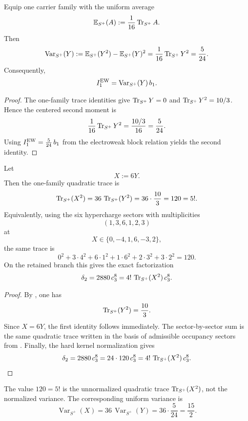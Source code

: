 \begin{corollary}
Equip one carrier family with the uniform average
\[
\mathbb E_{S^+}(A):=\frac{1}{16}\operatorname{Tr}_{S^+}A.
\]
Then
\[
\operatorname{Var}_{S^+}(Y)
:=
\mathbb E_{S^+}(Y^2)-\mathbb E_{S^+}(Y)^2
=
\frac{1}{16}\operatorname{Tr}_{S^+}Y^2
=
\frac{5}{24}.
\]
Consequently,
\[
I_1^{\mathrm{EW}}=\operatorname{Var}_{S^+}(Y)\,b_1.
\]
\end{corollary}

\begin{proof}
The one-family trace identities give $\operatorname{Tr}_{S^+}Y=0$ and $\operatorname{Tr}_{S^+}Y^2=10/3$. Hence the centered second moment is
\[
\frac{1}{16}\operatorname{Tr}_{S^+}Y^2=\frac{10/3}{16}=\frac{5}{24}.
\]
Using $I_1^{\mathrm{EW}}=\frac{5}{24}\,b_1$ from the electroweak block relation yields the second identity.
\end{proof}

\begin{corollary}
\label{cor:factorial-trace-delta2}
Let
\[
X:=6Y.
\]
Then the one-family quadratic trace is
\[
\operatorname{Tr}_{S^+}(X^2)
=
36\,\operatorname{Tr}_{S^+}(Y^2)
=
36\cdot\frac{10}{3}
=
120
=
5!.
\]
Equivalently, using the six hypercharge sectors with multiplicities
\[
(1,3,6,1,2,3)
\]
at
\[
X\in\{0,-4,1,6,-3,2\},
\]
the same trace is
\[
0^2+3\cdot 4^2+6\cdot 1^2+1\cdot 6^2+2\cdot 3^2+3\cdot 2^2=120.
\]
On the retained branch this gives the exact factorization
\[
\delta_2
=
2880\,c_3^8
=
4!\,\operatorname{Tr}_{S^+}(X^2)\,c_3^8.
\]
\end{corollary}

\begin{proof}
By , one has
\[
\operatorname{Tr}_{S^+}(Y^2)=\frac{10}{3}.
\]
Since $X=6Y$, the first identity follows immediately. The sector-by-sector sum is the same quadratic trace written in the basis of admissible occupancy sectors from . Finally, the hard kernel normalization gives
\[
\delta_2=2880\,c_3^8=24\cdot 120\,c_3^8
=
4!\,\operatorname{Tr}_{S^+}(X^2)\,c_3^8.
\]
\end{proof}

\begin{remark}
The value $120=5!$ is the unnormalized quadratic trace $\operatorname{Tr}_{S^+}(X^2)$, not the normalized variance. The corresponding uniform variance is
\[
\operatorname{Var}_{S^+}(X)=36\,\operatorname{Var}_{S^+}(Y)=36\cdot\frac{5}{24}=\frac{15}{2}.
\]
\end{remark}

